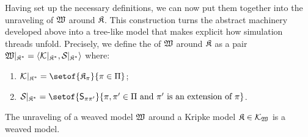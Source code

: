 \begin{definition}
	\medskip
	\noindent
	Having set up the necessary definitions, we can now put them together into the unraveling of $\mathfrak{W}$ around $\mathfrak{K}$. This construction turns the abstract machinery developed above into a tree-like model that makes explicit how simulation threads unfold.
	Precisely, we define the  of $\mathfrak{W}$ around $\mathfrak{K}$ as a pair $\mathfrak{W}\vert_{\mathfrak{K}^{*}} = \langle\mathcal{K}_{}\vert_{\mathfrak{K}^{*}}, \mathcal{S}_{}\vert_{\mathfrak{K}^{*}}\rangle$ where:
	\begin{enumerate}[leftmargin=\parindent,resume]
        \setlength{\itemsep}{0pt}
		\item $\Kuwm = \setof{\kmodel_\pi}{\pi \in \Pi}$;
		\item $\Suwm = \setof{\Sim_{\pi\pi'}}{\pi,\pi' \in \Pi \mbox{ and } \pi' \mbox{ is an extension of } \pi}$.
	\end{enumerate}
\end{definition}

\begin{proposition}
	The unraveling of a weaved model $\mathfrak{W}$ around a Kripke model $\mathfrak{K} \in \mathcal{K}_{\mathfrak{W}_{}}$ is a weaved model.
\end{proposition}


	
